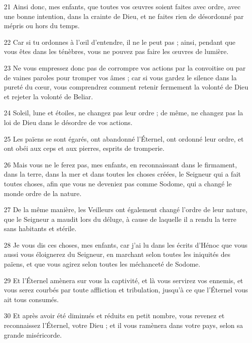 \par 21 Ainsi donc, mes enfants, que toutes vos œuvres soient faites avec ordre, avec une bonne intention, dans la crainte de Dieu, et ne faites rien de désordonné par mépris ou hors du temps.

\par 22 Car si tu ordonnes à l'œil d'entendre, il ne le peut pas ; ainsi, pendant que vous êtes dans les ténèbres, vous ne pouvez pas faire les œuvres de lumière.

\par 23 Ne vous empressez donc pas de corrompre vos actions par la convoitise ou par de vaines paroles pour tromper vos âmes ; car si vous gardez le silence dans la pureté du cœur, vous comprendrez comment retenir fermement la volonté de Dieu et rejeter la volonté de Beliar.

\par 24 Soleil, lune et étoiles, ne changez pas leur ordre ; de même, ne changez pas la loi de Dieu dans le désordre de vos actions.

\par 25 Les païens se sont égarés, ont abandonné l'Éternel, ont ordonné leur ordre, et ont obéi aux ceps et aux pierres, esprits de tromperie.

\par 26 Mais vous ne le ferez pas, mes enfants, en reconnaissant dans le firmament, dans la terre, dans la mer et dans toutes les choses créées, le Seigneur qui a fait toutes choses, afin que vous ne deveniez pas comme Sodome, qui a changé le monde ordre de la nature.

\par 27 De la même manière, les Veilleurs ont également changé l'ordre de leur nature, que le Seigneur a maudit lors du déluge, à cause de laquelle il a rendu la terre sans habitants et stérile.

\par 28 Je vous dis ces choses, mes enfants, car j'ai lu dans les écrits d'Hénoc que vous aussi vous éloignerez du Seigneur, en marchant selon toutes les iniquités des païens, et que vous agirez selon toutes les méchanceté de Sodome.

\par 29 Et l'Éternel amènera sur vous la captivité, et là vous servirez vos ennemis, et vous serez courbés par toute affliction et tribulation, jusqu'à ce que l'Éternel vous ait tous consumés.

\par 30 Et après avoir été diminués et réduits en petit nombre, vous revenez et reconnaissez l'Éternel, votre Dieu ; et il vous ramènera dans votre pays, selon sa grande miséricorde.

